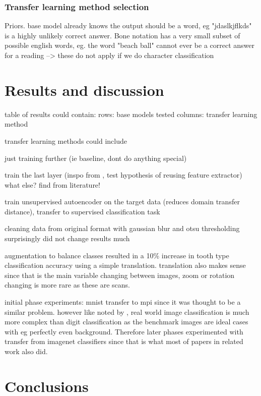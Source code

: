 \documentclass{article}
\begin{document}
\subsubsection{Transfer learning method selection}
Priors. base model already knows the output should be a word, eg "jdaslkjflkds" is a highly unlikely
correct answer.
Bone notation has a very small subset of possible english words, eg. the word "beach ball" cannot ever be a correct 
answer for a reading
--> these do not apply if we do character classification


\section{Results and discussion}



table of results could contain:
rows: base models tested 
columns: transfer learning method 

transfer learning methods could include 

just training further (ie baseline, dont do anything special)

train the last layer (inspo from \cite{tibetan_ocr}, test hypothesis of reusing feature extractor)
what else? find from literature!

train unsupervised autoencoder on the target data (reduces domain transfer distance),
transfer to supervised classification task

cleaning data from original format with gaussian blur and otsu thresholding surprisingly did not 
change results much 

augmentation to balance classes resulted in a 10\% increase in tooth type classification accuracy 
using a simple translation. translation also makes sense since that is the main variable changing 
between images, zoom or rotation changing is more rare as these are scans.

initial phase experiments: mnist transfer to mpi since it was thought to be a similar problem. 
however like noted by \cite{alexnet}, real world image classification is much more complex than digit classification 
as the benchmark images are ideal cases with eg perfectly even background. Therefore later phases 
experimented with transfer from imagenet classifiers since that is what most of papers in related work also did.

\section{Conclusions}

\printbibliography
\end{document}
